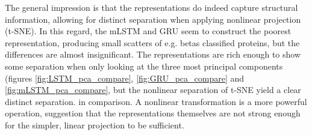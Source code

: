 \documentclass[a4paper,12pt]{article}
\begin{document}
The general impression is that the representations do indeed capture structural information, allowing for distinct separation when applying nonlinear projection (t-SNE). In this regard, the mLSTM and GRU seem to construct the poorest representation, producing small scatters of e.g. betas classified proteins, but the differences are almost insignificant. The representations are rich enough to show some separation when only looking at the three most principal components (figures \ref{fig:LSTM_pca_compare}, \ref{fig:GRU_pca_compare} and \ref{fig:mLSTM_pca_compare}, but the nonlinear separation of t-SNE yield a clear distinct separation. in comparison. A nonlinear transformation is a more powerful operation, suggestion that the representations themselves are not strong enough for the simpler, linear projection to be sufficient.
\end{document}
